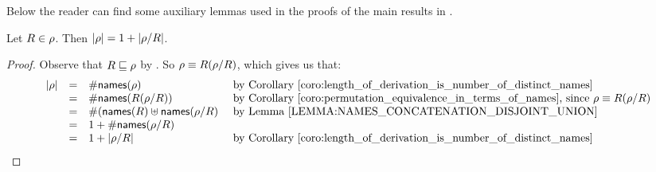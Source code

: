 Below the reader can find some auxiliary lemmas used in the proofs of the main
results in .

\begin{lemma}
Let $R \in \rho$. Then $|\rho| = 1 + |\rho/R|$.
\end{lemma}
\begin{proof}
Observe that $R \sqsubseteq \rho$ by .
So $\rho \equiv R(\rho/R)$, which gives us that:
\[
  \begin{array}{rcll}
  \lengthof{\redseq} & = & \#\names(\redseq) & \text{ by \rcoro{length_of_derivation_is_number_of_distinct_names}} \\
                     & = & \#\names(\redex(\redseq/\redex)) & \text{ by \rcoro{permutation_equivalence_in_terms_of_names}, since $\redseq \permeq \redex(\redseq/\redex)$} \\
                     & = & \#(\names(\redex) \uplus \names(\redseq/\redex) & \text{ by \rlem{names_concatenation_disjoint_union}} \\
                     & = & 1 + \#\names(\redseq/\redex) \\
                     & = & 1 + \lengthof{\redseq/\redex} & \text{ by \rcoro{length_of_derivation_is_number_of_distinct_names}} \\
  \end{array}
\]
\end{proof}

